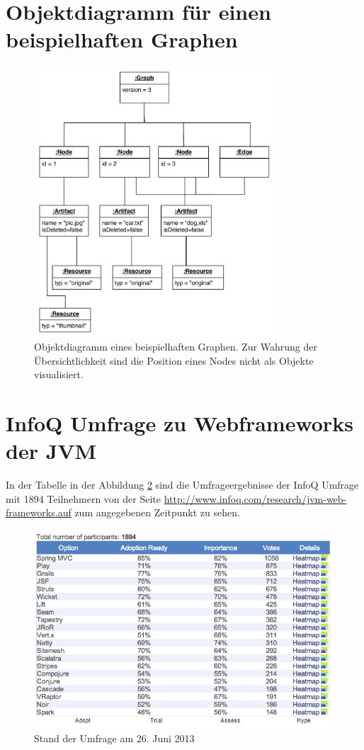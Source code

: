 \section{Objektdiagramm für einen beispielhaften Graphen}
\begin{figure}[h!t]
  \centering     
  \includegraphics[width=0.8\textwidth]{img/instanz_graph.pdf}  
   \caption{Objektdiagramm eines beispielhaften Graphen. Zur Wahrung der Übersichtlichkeit sind die Position eines Nodes nicht als Objekte visualisiert.}
  \label{fig:complete-model} 
\end{figure}
 
\section{InfoQ Umfrage zu Webframeworks der JVM}
In der Tabelle in der Abbildung \ref{fig:infoq-survey} sind die Umfrageergebnisse der InfoQ Umfrage mit 1894 Teilnehmern von der Seite \url{http://www.infoq.com/research/jvm-web-frameworks.auf} zum angegebenen Zeitpunkt zu sehen.
\begin{figure}[ht]  
  \centering     
  \includegraphics[width=1.0\textwidth]{img/infoq.png}  
   \caption{Stand der Umfrage am 26. Juni 2013}
  \label{fig:infoq-survey} 
\end{figure}

